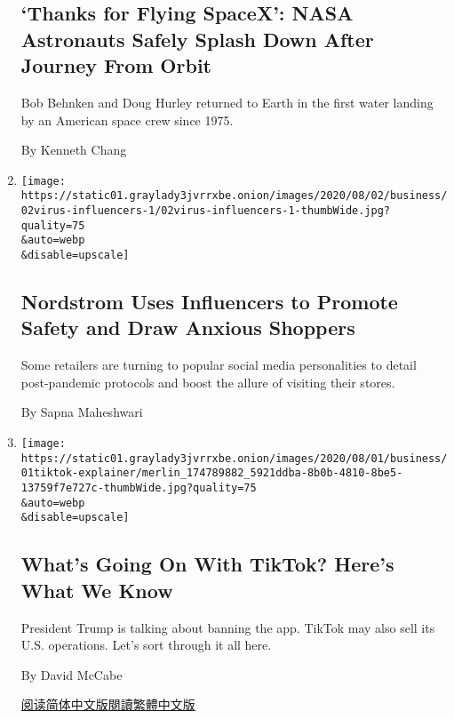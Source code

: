 \begin{enumerate}
  \hypertarget{thanks-for-flying-spacex-nasa-astronauts-safely-splash-down-after-journey-from-orbit}{%
  \subsection{`Thanks for Flying SpaceX': NASA Astronauts Safely Splash
  Down After Journey From
  Orbit}\label{thanks-for-flying-spacex-nasa-astronauts-safely-splash-down-after-journey-from-orbit}}

  Bob Behnken and Doug Hurley returned to Earth in the first water
  landing by an American space crew since 1975.

  By Kenneth Chang
\item
  \href{/2020/08/02/business/media/coronavirus-nordstrom-infuencers.html}{}

  \texttt{[image: https://static01.graylady3jvrrxbe.onion/images/2020/08/02/business/02virus-influencers-1/02virus-influencers-1-thumbWide.jpg?quality=75\\\&auto=webp\\\&disable=upscale]}

  \hypertarget{nordstrom-uses-influencers-to-promote-safety-and-draw-anxious-shoppers}{%
  \subsection{Nordstrom Uses Influencers to Promote Safety and Draw
  Anxious
  Shoppers}\label{nordstrom-uses-influencers-to-promote-safety-and-draw-anxious-shoppers}}

  Some retailers are turning to popular social media personalities to
  detail post-pandemic protocols and boost the allure of visiting their
  stores.

  By Sapna Maheshwari
\item
  \href{/2020/08/01/technology/tiktok-trump-microsoft-bytedance-china-ban.html}{}

  \texttt{[image: https://static01.graylady3jvrrxbe.onion/images/2020/08/01/business/01tiktok-explainer/merlin\_174789882\_5921ddba-8b0b-4810-8be5-13759f7e727c-thumbWide.jpg?quality=75\\\&auto=webp\\\&disable=upscale]}

  \hypertarget{whats-going-on-with-tiktok-heres-what-we-know}{%
  \subsection{What's Going On With TikTok? Here's What We
  Know}\label{whats-going-on-with-tiktok-heres-what-we-know}}

  President Trump is talking about banning the app. TikTok may also sell
  its U.S. operations. Let's sort through it all here.

  By David McCabe

  \href{https://cn.nytimes3xbfgragh.onion/technology/20200803/tiktok-trump-microsoft-bytedance-china-ban/}{阅读简体中文版}\href{https://cn.nytimes3xbfgragh.onion/technology/20200803/tiktok-trump-microsoft-bytedance-china-ban/zh-hant/}{閱讀繁體中文版}
\end{enumerate}

